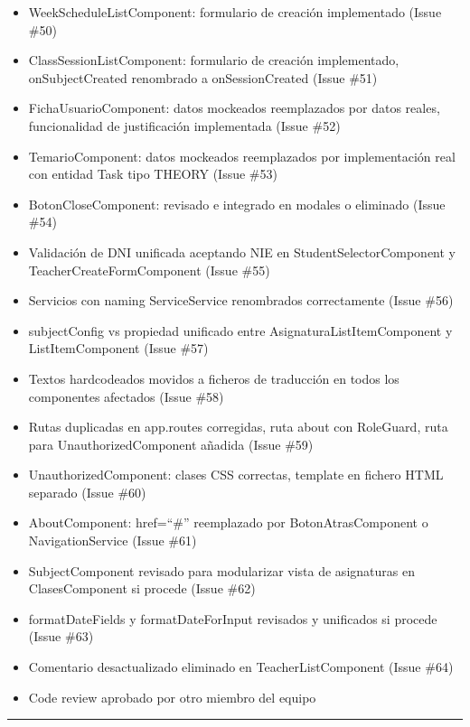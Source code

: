 \documentclass[
  spanish,
  11pt,
]{report}
\providecommand{\tightlist}{%
  \setlength{\itemsep}{0pt}\setlength{\parskip}{0pt}}
\begin{document}
\begin{itemize}
\tightlist
\item
  WeekScheduleListComponent: formulario de creación implementado (Issue
  \#50)
\item
  ClassSessionListComponent: formulario de creación implementado,
  onSubjectCreated renombrado a onSessionCreated (Issue \#51)
\item
  FichaUsuarioComponent: datos mockeados reemplazados por datos reales,
  funcionalidad de justificación implementada (Issue \#52)
\item
  TemarioComponent: datos mockeados reemplazados por implementación real
  con entidad Task tipo THEORY (Issue \#53)
\item
  BotonCloseComponent: revisado e integrado en modales o eliminado
  (Issue \#54)
\item
  Validación de DNI unificada aceptando NIE en StudentSelectorComponent
  y TeacherCreateFormComponent (Issue \#55)
\item
  Servicios con naming ServiceService renombrados correctamente (Issue
  \#56)
\item
  subjectConfig vs propiedad unificado entre AsignaturaListItemComponent
  y ListItemComponent (Issue \#57)
\item
  Textos hardcodeados movidos a ficheros de traducción en todos los
  componentes afectados (Issue \#58)
\item
  Rutas duplicadas en app.routes corregidas, ruta about con RoleGuard,
  ruta para UnauthorizedComponent añadida (Issue \#59)
\item
  UnauthorizedComponent: clases CSS correctas, template en fichero HTML
  separado (Issue \#60)
\item
  AboutComponent: href=``\#'' reemplazado por BotonAtrasComponent o
  NavigationService (Issue \#61)
\item
  SubjectComponent revisado para modularizar vista de asignaturas en
  ClasesComponent si procede (Issue \#62)
\item
  formatDateFields y formatDateForInput revisados y unificados si
  procede (Issue \#63)
\item
  Comentario desactualizado eliminado en TeacherListComponent (Issue
  \#64)
\item
  Code review aprobado por otro miembro del equipo
\end{itemize}

\begin{center}\rule{0.5\linewidth}{0.5pt}\end{center}
\end{document}
